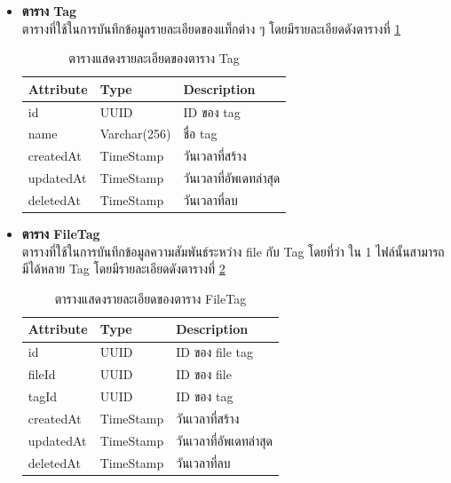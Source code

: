 \documentclass[12pt,oneside,openright,a4paper]{cpe-thai-project}
\begin{document}
\begin{itemize}
\item \textbf{ตาราง Tag}\\
ตารางที่ใช้ในการบันทึกข้อมูลรายละเอียดของแท็กต่าง ๆ โดยมีรายละเอียดดังตารางที่ \ref{tbl:dbTag}
\begin{table}[!ht]
    \centering
    \begin{tabular}{|p{4cm}|p{2cm}|p{6cm}|}
    \hline
    \textbf{Attribute} & \textbf{Type} & \textbf{Description}   \\ \hline
    id                 & UUID          & ID ของ tag             \\ \hline
    name               & Varchar(256)   & ชื่อ tag               \\ \hline
    createdAt          & TimeStamp     & วันเวลาที่สร้าง        \\ \hline
    updatedAt          & TimeStamp     & วันเวลาที่อัพเดทล่าสุด \\ \hline
    deletedAt          & TimeStamp     & วันเวลาที่ลบ       \\ \hline
    \end{tabular}
    \caption{\centering  ตารางแสดงรายละเอียดของตาราง Tag} \label{tbl:dbTag}
\end{table}
\newpage
\item \textbf{ตาราง FileTag}\\
ตารางที่ใช้ในการบันทึกข้อมูลความสัมพันธ์ระหว่าง file กับ Tag โดยที่ว่า ใน 1 ไฟล์นั้นสามารถมีได้หลาย Tag โดยมีรายละเอียดดังตารางที่ \ref{tbl:dbFileTag}
\begin{table}[!ht]
    \centering
    \begin{tabular}{|p{4cm}|p{2cm}|p{6cm}|}
    \hline
    \textbf{Attribute} & \textbf{Type} & \textbf{Description}   \\ \hline
    id                 & UUID          & ID ของ file tag        \\ \hline
    fileId             & UUID          & ID ของ file            \\ \hline
    tagId              & UUID          & ID ของ tag             \\ \hline
    createdAt          & TimeStamp     & วันเวลาที่สร้าง        \\ \hline
    updatedAt          & TimeStamp     & วันเวลาที่อัพเดทล่าสุด \\ \hline
    deletedAt          & TimeStamp     & วันเวลาที่ลบ          \\ \hline
    \end{tabular}
    \caption{\centering  ตารางแสดงรายละเอียดของตาราง FileTag} \label{tbl:dbFileTag}
\end{table}


\end{itemize}
\end{document}
